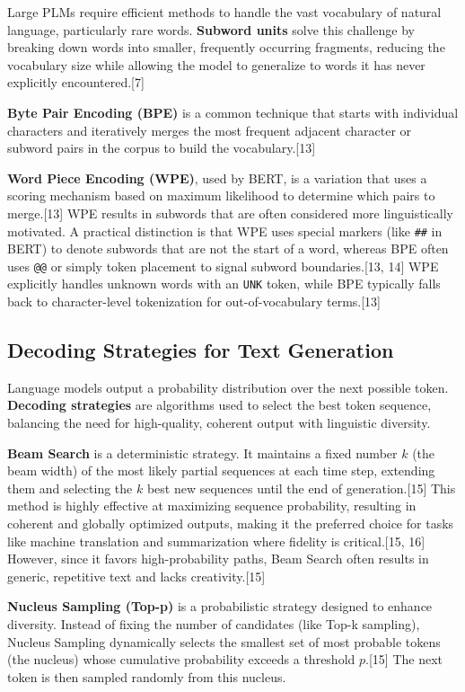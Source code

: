 \documentclass{article}
\begin{document}
Large PLMs require efficient methods to handle the vast vocabulary of natural language, particularly rare words. \textbf{Subword units} solve this challenge by breaking down words into smaller, frequently occurring fragments, reducing the vocabulary size while allowing the model to generalize to words it has never explicitly encountered.[7]

\textbf{Byte Pair Encoding (BPE)} is a common technique that starts with individual characters and iteratively merges the most frequent adjacent character or subword pairs in the corpus to build the vocabulary.[13]

\textbf{Word Piece Encoding (WPE)}, used by BERT, is a variation that uses a scoring mechanism based on maximum likelihood to determine which pairs to merge.[13] WPE results in subwords that are often considered more linguistically motivated. A practical distinction is that WPE uses special markers (like \texttt{\#\#} in BERT) to denote subwords that are not the start of a word, whereas BPE often uses \texttt{@@} or simply token placement to signal subword boundaries.[13, 14] WPE explicitly handles unknown words with an \texttt{UNK} token, while BPE typically falls back to character-level tokenization for out-of-vocabulary terms.[13]

\subsection{Decoding Strategies for Text Generation}

Language models output a probability distribution over the next possible token. \textbf{Decoding strategies} are algorithms used to select the best token sequence, balancing the need for high-quality, coherent output with linguistic diversity.

\textbf{Beam Search} is a deterministic strategy. It maintains a fixed number $k$ (the beam width) of the most likely partial sequences at each time step, extending them and selecting the $k$ best new sequences until the end of generation.[15] This method is highly effective at maximizing sequence probability, resulting in coherent and globally optimized outputs, making it the preferred choice for tasks like machine translation and summarization where fidelity is critical.[15, 16] However, since it favors high-probability paths, Beam Search often results in generic, repetitive text and lacks creativity.[15]

\textbf{Nucleus Sampling (Top-p)} is a probabilistic strategy designed to enhance diversity. Instead of fixing the number of candidates (like Top-k sampling), Nucleus Sampling dynamically selects the smallest set of most probable tokens (the nucleus) whose cumulative probability exceeds a threshold $p$.[15] The next token is then sampled randomly from this nucleus.
\end{document}
